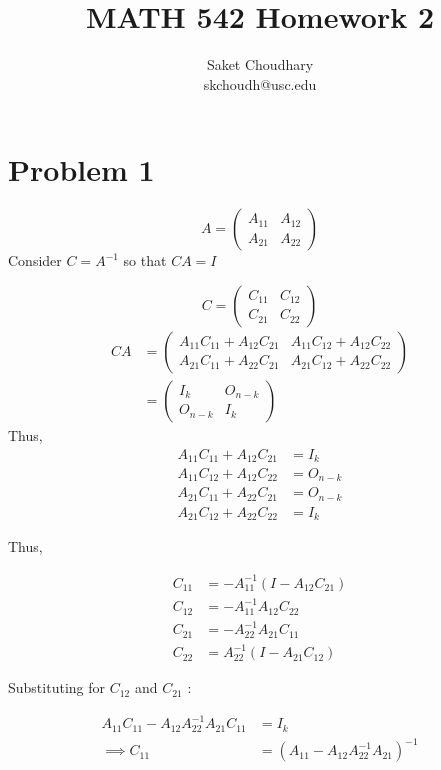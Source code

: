 \documentclass[a4paper]{article}
\title{MATH 542 Homework 2}
\author{Saket Choudhary\\skchoudh@usc.edu}
\begin{document}
\maketitle 
\section*{Problem 1}
$$ A=\begin{pmatrix} A_{11} & A_{12}\\ 
A_{21} & A_{22}
\end{pmatrix} $$Consider $C=A^{-1}$ so that $CA=I$

$$
C = \begin{pmatrix} C_{11} & C_{12}\\ C_{21} & C_{22}\end{pmatrix}
$$
\begin{align*}
CA &= \begin{pmatrix} A_{11}C_{11}+A_{12}C_{21} & A_{11}C_{12}+A_{12}C_{22}\\  
A_{21}C_{11}+A_{22}C_{21} & A_{21}C_{12}+A_{22}C_{22}
\end{pmatrix}\\
&= \begin{pmatrix} I_k &  O_{n-k} \\ O_{n-k} & I_{k} \end{pmatrix}
\end{align*}
Thus,
\begin{align*}
A_{11}C_{11}+A_{12}C_{21} &=  I_k\\
A_{11}C_{12}+A_{12}C_{22} &= O_{n-k}\\
A_{21}C_{11}+A_{22}C_{21} &= O_{n-k}\\
A_{21}C_{12}+A_{22}C_{22}&=I_k 
\end{align*}

Thus,

\begin{align*}
C_{11}&= -A_{11}^{-1}(I-A_{12}C_{21})\\
C_{12} &= -A_{11}^{-1}A_{12}C_{22}\\ 
C_{21} &= -A_{22}^{-1}A_{21}C_{11}\\
C_{22}&=A_{22}^{-1}(I-A_{21}C_{12})
\end{align*}

Substituting for $C_{12}$ and $C_{21}$ :


\begin{align*}
A_{11}C_{11}-A_{12}A_{22}^{-1}A_{21}C_{11} &= I_k\\
\implies C_{11} &= (A_{11}-A_{12}A_{22}^{-1}A_{21})^{-1}
\end{align*}
\end{document}
